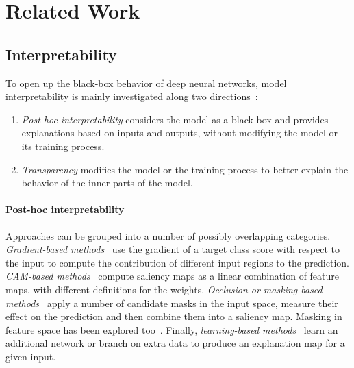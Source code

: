 \section{Related Work}

\subsection{Interpretability}

To open up the black-box behavior of deep neural networks, model interpretability is mainly investigated along two directions~\citep{lipton18, guidotti2018survey, zhang2021survey}:
\begin{enumerate}[itemsep=2pt, parsep=0pt, topsep=3pt]
	\item \emph{Post-hoc interpretability} considers the model as a black-box and provides explanations based on inputs and outputs, without modifying the model or its training process.
	\item \emph{Transparency} modifies the model or the training process to better explain the behavior of the inner parts of the model.
\end{enumerate}

\paragraph{Post-hoc interpretability}

Approaches can be grouped into a number of possibly overlapping categories. \emph{Gradient-based methods}~\citep{adebayo2018local, springenberg2014striving, baehrens2010explain, simonyan2013deep, smilkov2017smoothgrad, bach2015pixel, sundararajan2017axiomatic} use the gradient of a target class score with respect to the input to compute the contribution of different input regions to the prediction. \emph{CAM-based methods}~\citep{DBLP:journals/corr/abs-1910-01279, DBLP:journals/corr/abs-1710-11063, DBLP:journals/corr/SelvarajuDVCPB16, fu2020axiom, jiang2021layercam, ramaswamy2020ablation} compute saliency maps as a linear combination of feature maps, with different definitions for the weights. \emph{Occlusion or masking-based methods}~\citep{petsiuk2018rise, fong2017interpretable, fong2019understanding, schulz2020restricting, ribeiro2016should} apply a number of candidate masks in the input space, measure their effect on the prediction and then combine them into a saliency map. Masking in feature space has been explored too~\cite{schulz2020restricting}. Finally, \emph{learning-based methods}~\citep{chang2018explaining, dabkowski2017real, phang2020investigating, zolna2020classifier, schulz2020restricting} learn an additional network or branch on extra data to produce an explanation map for a given input. 

